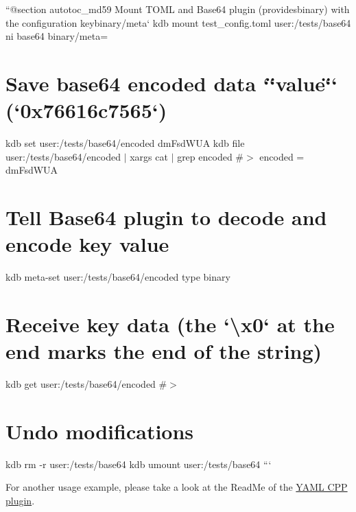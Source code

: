 ``{\ttfamily  @section autotoc\+\_\+md59 Mount T\+O\+ML and Base64 plugin (provides}binary{\ttfamily ) with the configuration key}binary/meta` kdb mount test\+\_\+config.\+toml user\+:/tests/base64 ni base64 binary/meta=\hypertarget{autotoc_md51_autotoc_md60}{}\section{Save base64 encoded data `\char`\"{}value\char`\"{}` (`0x76616c7565`)}\label{autotoc_md51_autotoc_md60}
kdb set user\+:/tests/base64/encoded dm\+Fsd\+W\+UA kdb file user\+:/tests/base64/encoded $\vert$ xargs cat $\vert$ grep encoded \#$>$ encoded = dm\+Fsd\+W\+UA\hypertarget{autotoc_md51_autotoc_md61}{}\section{Tell Base64 plugin to decode and encode key value}\label{autotoc_md51_autotoc_md61}
kdb meta-\/set user\+:/tests/base64/encoded type binary\hypertarget{autotoc_md51_autotoc_md62}{}\section{Receive key data (the `\textbackslash{}x0` at the end marks the end of the string)}\label{autotoc_md51_autotoc_md62}
kdb get user\+:/tests/base64/encoded \#$>$ \hypertarget{autotoc_md51_autotoc_md63}{}\section{Undo modifications}\label{autotoc_md51_autotoc_md63}
kdb rm -\/r user\+:/tests/base64 kdb umount user\+:/tests/base64 ```

For another usage example, please take a look at the Read\+Me of the \hyperlink{autotoc_md817_src_plugins_yamlcpp_README_md}{Y\+A\+ML C\+PP plugin}. 